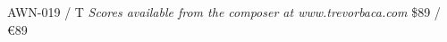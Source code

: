 \documentclass[11pt]{report}
\begin{document}
\null \vfill

AWN-019 / T \hfill
\textit{Scores available from the composer at www.trevorbaca.com}
\hfill \$89 / \euro 89
\end{document}
